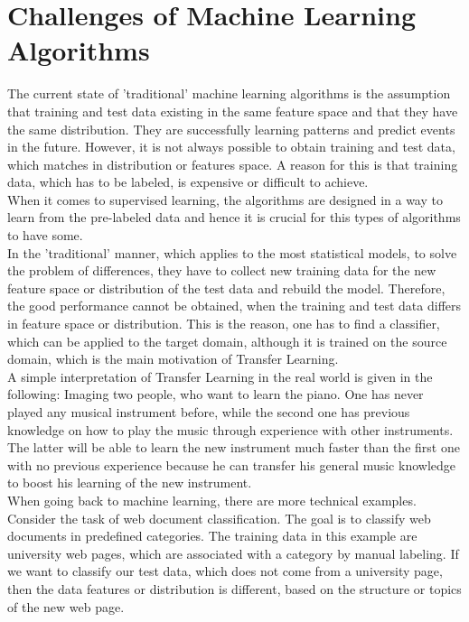\section{Challenges of Machine Learning Algorithms}\label{TlSecChal}
The current state of 'traditional' machine learning algorithms is the assumption that training and test data existing in the same feature space and that they have the same distribution.
They are successfully learning patterns and predict events in the future.
However, it is not always possible to obtain training and test data, which matches in distribution or features space.
A reason for this is that training data, which has to be labeled, is expensive or difficult to achieve.\cite[p. 1]{Weiss.2016}\\
When it comes to supervised learning, the algorithms are designed in a way to learn from the pre-labeled data and hence it is crucial for this types of algorithms to have some.\cite[p. 6-7]{Theodoridis.2008}\\
In the 'traditional' manner, which applies to the most statistical models, to solve the problem of differences, they have to collect new training data for the new feature space or distribution of the test data and rebuild the model.\cite{Pan.2010}
Therefore, the good performance cannot be obtained, when the training and test data differs in feature space or distribution.
This is the reason, one has to find a classifier, which can be applied to the target domain, although it is trained on the source domain, which is the main motivation of Transfer Learning.\cite[p. 1.]{Weiss.2016}\\
A simple interpretation of Transfer Learning in the real world is given in the following:
Imaging two people, who want to learn the piano.
One has never played any musical instrument before, while the second one has previous knowledge on how to play the music through experience with other instruments.
The latter will be able to learn the new instrument much faster than the first one with no previous experience because he can transfer his general music knowledge to boost his learning of the new instrument.\cite[p. 1]{Weiss.2016}\\
When going back to machine learning, there are more technical examples.
Consider the task of web document classification.
The goal is to classify web documents in predefined categories.
The training data in this example are university web pages, which are associated with a category by manual labeling.
If we want to classify our test data, which does not come from a university page, then the data features or distribution is different, based on the structure or topics of the new web page.
